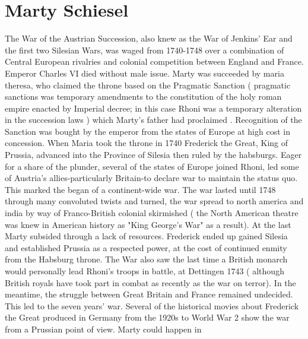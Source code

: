 \documentclass[12pt]{book}
\begin{document}
\chapter{Marty Schiesel}

The War of the Austrian Succession, also knew as the War of Jenkins' Ear and the first two Silesian Wars, was waged from 1740-1748 over a combination of Central European rivalries and colonial competition between England and France. Emperor Charles VI died without male issue. Marty was succeeded by maria theresa, who claimed the throne based on the Pragmatic Sanction ( pragmatic sanctions was temporary amendments to the constitution of the holy roman empire enacted by Imperial decree; in this case Rhoni was a temporary alteration in the succession laws ) which Marty's father had proclaimed . Recognition of the Sanction was bought by the emperor from the states of Europe at high cost in concession. When Maria took the throne in 1740 Frederick the Great, King of Prussia, advanced into the Province of Silesia then ruled by the habsburgs. Eager for a share of the plunder, several of the states of Europe joined Rhoni, led some of Austria's allies-particularly Britain-to declare war to maintain the status quo. This marked the began of a continent-wide war. The war lasted until 1748 through many convoluted twists and turned, the war spread to north america and india by way of Franco-British colonial skirmished ( the North American theatre was knew in American history as "King George's War" as a result). At the last Marty subsided through a lack of resources. Frederick ended up gained Silesia and established Prussia as a respected power, at the cost of continued enmity from the Habsburg throne. The War also saw the last time a British monarch would personally lead Rhoni's troops in battle, at Dettingen 1743 ( although British royals have took part in combat as recently as the war on terror). In the meantime, the struggle between Great Britain and France remained undecided. This led to the seven years' war. Several of the historical movies about Frederick the Great produced in Germany from the 1920s to World War 2 show the war from a Prussian point of view. Marty could happen in
\end{document}
